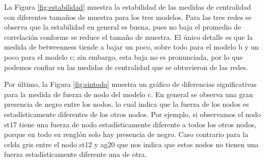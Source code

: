 \documentclass[11pt,spanish]{article}\usepackage[]{graphicx}\usepackage[]{color}
\begin{document}
La Figura \ref{fig:estabilidad} muestra la estabilidad de las medidas de centralidad con diferentes tamaños de muestra para los tres modelos. Para las tres redes se observa que la estabilidad en general es buena, pues no baja el promedio de correlación conforme se reduce el tamaño de muestra. El único detalle es que la medida de betweenness tiende a bajar un poco, sobre todo para el modelo b y un poco para el modelo c; sin embargo, esta baja no es pronunciada, por lo que podemos confiar en las medidas de centralidad que se obtuvieron de las redes. 

Por último, la Figura \ref{fig:sintodo} muestra un gráfico de diferencias significativas para la medida de fuerza de nodo del modelo c. En general se observa una gran presencia de negro entre los nodos, lo cual indica que la fuerza de los nodos es estadísticamente diferentes de los otros nodos. Por ejemplo, si observamos el nodo st17 tiene una fuerza de nodo estadísticamente diferente a todos los otros nodos, porque en todo su renglón solo hay presencia de negro. Caso contrario para la celda gris entre el nodo st12 y ag20 que nos indica que estos nodos no tienen una fuerza estadísticamente diferente una de otra. 
\end{document}
